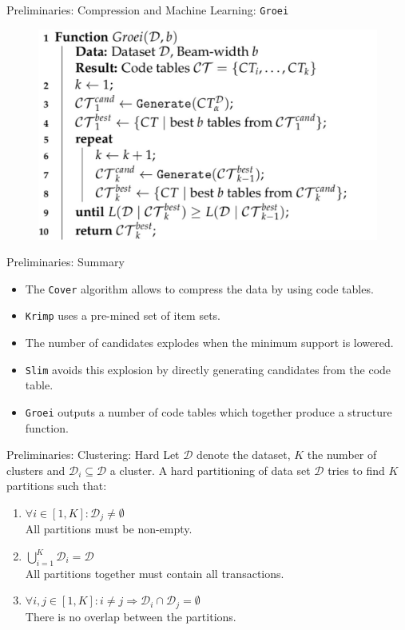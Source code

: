 \documentclass{beamer}
\newcommand{\dataset}{\mathcal{D}}
\newcommand{\groei}{\texttt{Groei}}
\begin{document}
\begin{frame}{Preliminaries: Compression and Machine Learning: \groei}
\begin{figure}[H]
  \centering
   \includegraphics[width=\textwidth]{img/groei}
\end{figure}
\end{frame}

\begin{frame}{Preliminaries: Summary}
\begin{itemize}
	\item The \texttt{Cover} algorithm allows to compress the data by using code tables.
	\item \texttt{Krimp} uses a pre-mined set of item sets.
	\item The number of candidates explodes when the minimum support is lowered.
	\item \texttt{Slim} avoids this explosion by directly generating candidates from the code table.
	\item \texttt{Groei} outputs a number of code tables which together produce a structure function.
\end{itemize}
\end{frame}


\begin{frame}{Preliminaries: Clustering: Hard}
Let $\dataset$ denote the dataset, $K$ the number of clusters and $\dataset_i \subseteq \dataset$ a cluster. A hard partitioning of data set $\dataset$ tries to find $K$ partitions such that:
	\begin{enumerate}
		\item $\forall i \in [1,K]: \dataset_j \neq \emptyset$ \\ All partitions must be non-empty.
		\item $\bigcup\limits_{i=1}^{K} \dataset_i = \dataset$ \\ All partitions together must contain all transactions.
		\item $\forall i,j \in [1,K]: i \neq j \Rightarrow \dataset_i \cap \dataset_j = \emptyset$ \\ There is no overlap between the partitions.
	\end{enumerate}
\end{frame}
\end{document}

